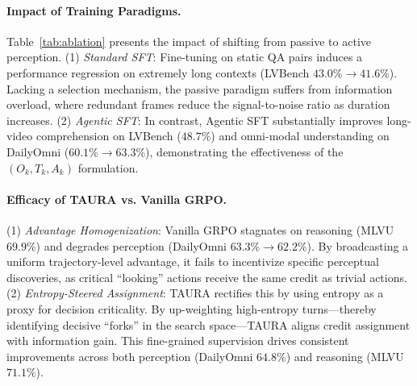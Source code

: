 \documentclass{article}
\theoremstyle{plain}
\theoremstyle{definition}
\theoremstyle{remark}
\begin{document}
\paragraph{Impact of Training Paradigms.}
Table~\ref{tab:ablation} presents the impact of shifting from passive to active perception.
(1) \textit{Standard SFT}: Fine-tuning on static QA pairs induces a performance regression on extremely long contexts (LVBench $43.0\% \to 41.6\%$). Lacking a selection mechanism, the passive paradigm suffers from information overload, where redundant frames reduce the signal-to-noise ratio as duration increases.
(2) \textit{Agentic SFT}: In contrast, Agentic SFT substantially improves long-video comprehension on LVBench ($48.7\%$) and omni-modal understanding on DailyOmni ($60.1\% \to 63.3\%$), demonstrating the effectiveness of the $(O_k, T_k, A_k)$ formulation.

\paragraph{Efficacy of TAURA vs. Vanilla GRPO.}
(1) \textit{Advantage Homogenization}: Vanilla GRPO stagnates on reasoning (MLVU $69.9\%$) and degrades perception (DailyOmni $63.3\% \to 62.2\%$).
By broadcasting a uniform trajectory-level advantage, it fails to
incentivize specific perceptual discoveries, as critical ``looking''
actions receive the same credit as trivial actions.
(2) \textit{Entropy-Steered Assignment}: TAURA rectifies this by using entropy as a proxy for decision criticality. By up-weighting high-entropy turns---thereby identifying decisive ``forks'' in the search space---TAURA aligns credit assignment with information gain. This fine-grained supervision drives consistent improvements across both perception (DailyOmni $64.8\%$) and reasoning (MLVU $71.1\%$).
\end{document}
